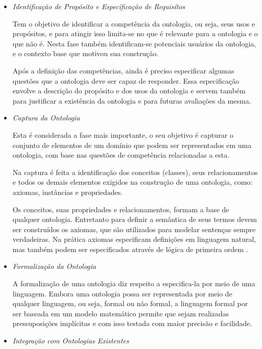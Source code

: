 \begin{itemize}
    \item \textit{Identificação de Propósito e Especificação de Requisítos}

    Tem o objetivo de identificar a competência da ontologia, ou seja, seus usos
    e propósitos, e para atingir isso limita-se no que é relevante para a ontologia
    e o que não é. Nesta fase também identificam-se potenciais usuários da ontologia,
    e o contexto base que motivou sua construção.

    Após a definição das competências, ainda é preciso especificar algumas
    questões que a ontologia deve ser capaz de responder. Essa especificação
    envolve a descrição do propósito e dos usos da ontologia e servem também para
    justificar a existência da ontologia e para futuras avaliações da mesma.

    \item \textit{Captura da Ontologia}

    Esta é considerada a fase mais importante, o seu objetivo é capturar o
    conjunto de elementos de um domínio que podem ser representados em uma
    ontologia, com base nas questões de competência relacionadas a esta.

    Na captura é feita a identificação dos conceitos (classes), seus
    relacionamentos e todos os demais elementos exigidos na construção de uma
    ontologia, como: axiomas, instâncias e propriedades.

    Os conceitos, suas propriedades e relacionamentos, formam a base de qualquer
    ontologia. Entretanto para definir a semântica de seus termos devem ser
    construídos os axiomas, que são utilizados para modelar sentenças sempre
    verdadeiras. Na prática axiomas especificam definições em linguagem natural,
    mas também podem ser especificados através de lógica de primeira ordem
    \cite{falbo1998integracao}.

    \item \textit{Formalização da Ontologia}

    A formalização de uma ontologia diz respeito a especifica-la por meio de uma
    linguagem. Embora uma ontologia possa ser representada por meio de qualquer
    linguagem, ou seja, formal ou não formal, a linguagem formal por ser baseada
    em um modelo matemático permite que sejam realizadas pressuposições
    implícitas e com isso testada com maior precisão e facilidade.

    \item \textit{Integração com Ontologias Existentes}


\end{itemize}
